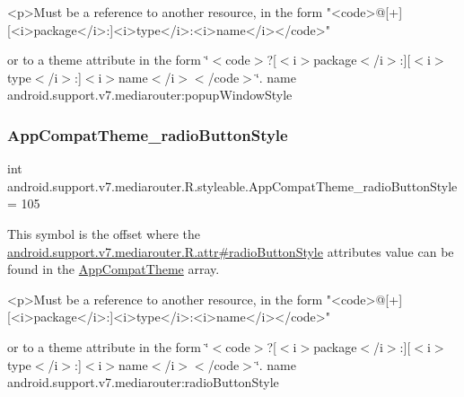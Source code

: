 \begin{DoxyVerb}      <p>Must be a reference to another resource, in the form "<code>@[+][<i>package</i>:]<i>type</i>:<i>name</i></code>"
\end{DoxyVerb}
 or to a theme attribute in the form \char`\"{}$<$code$>$?\mbox{[}$<$i$>$package$<$/i$>$\+:\mbox{]}\mbox{[}$<$i$>$type$<$/i$>$\+:\mbox{]}$<$i$>$name$<$/i$>$$<$/code$>$\char`\"{}.  name android.\+support.\+v7.\+mediarouter\+:popup\+Window\+Style \mbox{\label{classandroid_1_1support_1_1v7_1_1mediarouter_1_1R_1_1styleable_a8dc461bdd424e8433282468c37c8d386}} 
\subsubsection{\texorpdfstring{App\+Compat\+Theme\+\_\+radio\+Button\+Style}{AppCompatTheme\_radioButtonStyle}}
{\footnotesize\ttfamily int android.\+support.\+v7.\+mediarouter.\+R.\+styleable.\+App\+Compat\+Theme\+\_\+radio\+Button\+Style = 105\hspace{0.3cm}{\ttfamily [static]}}

This symbol is the offset where the \hyperlink{classandroid_1_1support_1_1v7_1_1mediarouter_1_1R_1_1attr_a1879851274fd4f59cc148d48886e3dce}{android.\+support.\+v7.\+mediarouter.\+R.\+attr\#radio\+Button\+Style} attribute\textquotesingle{}s value can be found in the \hyperlink{classandroid_1_1support_1_1v7_1_1mediarouter_1_1R_1_1styleable_a4e3d3900c75d49aeb2f283cac00214d6}{App\+Compat\+Theme} array.

\begin{DoxyVerb}      <p>Must be a reference to another resource, in the form "<code>@[+][<i>package</i>:]<i>type</i>:<i>name</i></code>"
\end{DoxyVerb}
 or to a theme attribute in the form \char`\"{}$<$code$>$?\mbox{[}$<$i$>$package$<$/i$>$\+:\mbox{]}\mbox{[}$<$i$>$type$<$/i$>$\+:\mbox{]}$<$i$>$name$<$/i$>$$<$/code$>$\char`\"{}.  name android.\+support.\+v7.\+mediarouter\+:radio\+Button\+Style \mbox{\label{classandroid_1_1support_1_1v7_1_1mediarouter_1_1R_1_1styleable_ab10f79a17ff8b7943d3a05296cc7e765}} 
